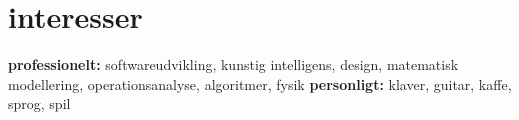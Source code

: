 \documentclass[]{../friggeri-cv} %
\begin{document}
\section{interesser}
\textbf{professionelt:} softwareudvikling,  kunstig intelligens, design, matematisk modellering, operationsanalyse,  algoritmer, fysik
\textbf{personligt:} klaver, guitar, kaffe, sprog, spil
%
%
%
%
%
%
%
%
%
\end{document}
